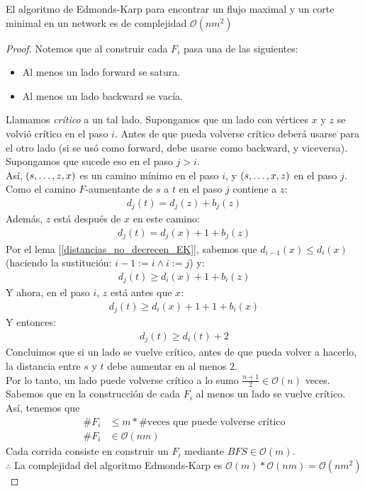 \begin{theorem} 
  El algoritmo de Edmonds-Karp para encontrar un flujo maximal y un corte minimal en un network es de complejidad $\mathcal{O}(n m^2)$
\end{theorem}
\begin{proof}
  Notemos que al construir cada $F_i$ pasa una de las siguientes:
  \begin{itemize}
  \item Al menos un lado forward se satura.
  \item Al menos un lado backward se vacía.
  \end{itemize}
  Llamamos \emph{crítico} a un tal lado.
  Supongamos que un lado con vértices $x$ y $z$ se volvió crítico en el paso $i$. Antes de que pueda volverse crítico deberá usarse para el otro lado (si se usó como forward, debe usarse como backward, y viceversa). Supongamos que sucede eso en el paso $j > i$.\\
  Así, $(s, \mathellipsis, z, x)$ es un camino mínimo en el paso $i$, y $(s,\mathellipsis, x, z)$ en el paso $j$.
  Como el camino $F$-aumentante de $s$ a $t$ en el paso $j$ contiene a $z$:
  \begin{align}
    d_j(t) = d_j(z)+b_j(z)
  \end{align}
  Además, $z$ está después de $x$ en este camino:
  \begin{align}
    d_j(t) = d_j(x) + 1 + b_j(z)
  \end{align}
  Por el lema [\ref{distancias_no_decrecen_EK}], sabemos que $d_{i-1}(x) \le d_i(x)$ (haciendo la sustitución: $i-1 := i \wedge i := j$) y:\begin{align}
    d_j(t) \ge d_i(x) + 1 + b_i(z)
  \end{align}
  Y ahora, en el paso $i$, $z$ está antes que $x$:
  \begin{align}
    d_j(t) \ge d_i(x) + 1 + 1 + b_i(x)
  \end{align}
  Y entonces:
  \begin{align}
    d_j(t) \ge d_i(t) + 2
  \end{align}
  Concluimos que si un lado se vuelve crítico, antes de que pueda volver a hacerlo, la distancia entre $s$ y $t$ debe aumentar en al menos $2$.\\
  Por lo tanto, un lado puede volverse crítico a lo sumo $\frac{n+1}{2} \in \mathcal{O}(n)$ veces.
  Sabemos que en la construcción de cada $F_i$ al menos un lado se vuelve crítico. Así, tenemos que \begin{align}
    \# F_i &\le m * \# \text{veces que puede volverse crítico}\\
    \# F_i &\in \mathcal{O}(nm)
  \end{align}
  Cada corrida consiste en construir un $F_i$ mediante $BFS \in \mathcal{O}(m)$.\\
  $\therefore$ La complejidad del algoritmo Edmonds-Karp es $\mathcal{O}(m) * \mathcal{O}(nm) = \mathcal{O}(nm^2)$
\end{proof}

